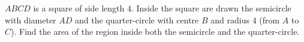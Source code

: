 $ABCD$ is a square of side length $4$. Inside the square are drawn the semicircle with diameter $AD$ and the quarter-circle with centre $B$ and radius $4$ (from $A$ to $C$). Find the area of the region inside both the semicircle and the quarter-circle.
